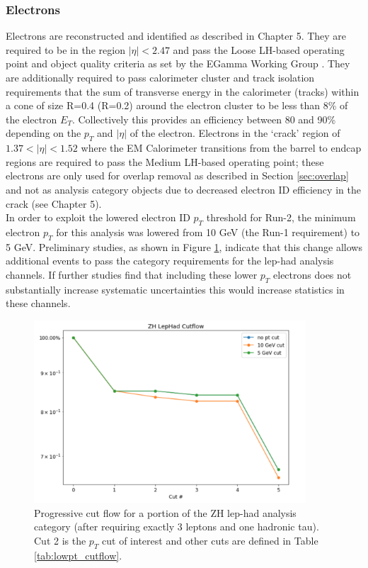 \subsubsection{Electrons}
Electrons are reconstructed and identified as described in Chapter 5. They are required to be in the region $|\eta|<2.47$ and pass the Loose LH-based operating point and object quality criteria as set by the EGamma Working Group \cite{egam_cp}. They are additionally required to pass calorimeter cluster and track isolation requirements that the sum of transverse energy in the calorimeter (tracks) within a cone of size R=0.4 (R=0.2) around the electron cluster to be less than 8\% of the electron $E_T$. Collectively this provides an efficiency between 80 and 90\% depending on the $p_T$ and $|\eta|$ of the electron. Electrons in the  `crack' region of $1.37<|\eta|<1.52$ where the EM Calorimeter transitions from the barrel to endcap regions are required to pass the Medium LH-based operating point; these electrons are only used for overlap removal as described in Section \ref{sec:overlap} and not as analysis category objects due to decreased electron ID efficiency in the crack (see Chapter 5).\\

In order to exploit the lowered electron ID $p_T$ threshold for Run-2, the minimum electron $p_T$ for this analysis was lowered from 10 GeV (the Run-1 requirement) to 5 GeV. Preliminary studies, as shown in Figure \ref{fig:lowpt_cuflow}, indicate that this change allows additional events to pass the category requirements for the lep-had analysis channels. If further studies find that including these lower $p_T$ electrons does not substantially increase systematic uncertainties this would increase statistics in these channels.

\begin{figure}[htb!]
    \centering
    \includegraphics[width=4in]{figures/chapter6/lowpt_zhlephad_cutflow.png}
    \caption{Progressive cut flow for a portion of the ZH lep-had analysis category (after requiring exactly 3 leptons and one hadronic tau). Cut 2 is the $p_T$ cut of interest and other cuts are defined in Table \ref{tab:lowpt_cutflow}.}
    \label{fig:lowpt_cuflow}
\end{figure}

